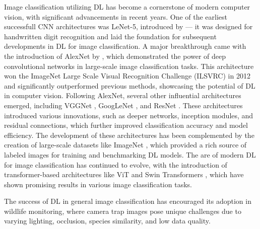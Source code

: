 Image classification utilizing \ac{DL} has become a cornerstone of modern computer vision, with significant advancements in recent years.
One of the earliest successfull \ac{CNN} architectures was LeNet-5, introduced by \textcite{lecunGradientbasedLearningApplied1998} --- it was designed for handwritten digit recognition and laid the foundation for subsequent developments in \ac{DL} for image classification.
A major breakthrough came with the introduction of AlexNet by \textcite{krizhevskyImageNetClassificationDeep2012}, which demonstrated the power of deep convolutional networks in large-scale image classification tasks.
This architecture won the ImageNet Large Scale Visual Recognition Challenge (ILSVRC) in 2012 and significantly outperformed previous methods, showcasing the potential of \ac{DL} in computer vision.
Following AlexNet, several other influential architectures emerged, including VGGNet \autocite{simonyanVeryDeepConvolutional2015}, GoogLeNet \autocite{szegedyGoingDeeperConvolutions2015}, and ResNet \autocite{heDeepResidualLearning2016}.
These architectures introduced various innovations, such as deeper networks, inception modules, and residual connections, which further improved classification accuracy and model efficiency.
The development of these architectures has been complemented by the creation of large-scale datasets like ImageNet \autocite{dengImageNetLargescaleHierarchical2009}, which provided a rich source of labeled images for training and benchmarking \ac{DL} models.
The are of modern \ac{DL} for image classification has continued to evolve, with the introduction of transformer-based architectures like \ac{ViT} \autocite{dosovitskiyImageWorth16x162021} and Swin Transformers \autocite{liuSwinTransformerHierarchical2021}, which have shown promising results in various image classification tasks.


The success of \ac{DL} in general image classification has encouraged its adoption in wildlife monitoring, where camera trap images pose unique challenges due to varying lighting, occlusion, species similarity, and low data quality.


